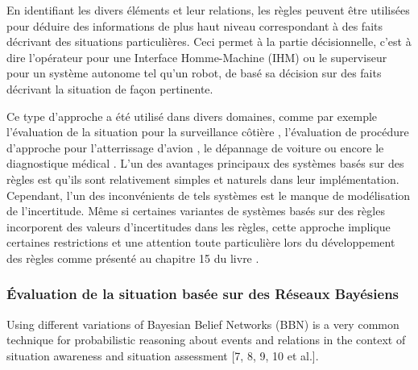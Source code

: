 \documentclass[a4paper,11pt,twoside]{StyleThese}
\begin{document}
En identifiant les divers éléments et leur relations, les règles peuvent être utilisées pour déduire des informations de plus haut niveau correspondant à des faits décrivant des situations particulières. Ceci permet à la partie décisionnelle, c'est à dire l'opérateur pour une Interface Homme-Machine (IHM) ou le superviseur pour un système autonome tel qu'un robot, de basé sa décision sur des faits décrivant la situation de façon pertinente.

Ce type d'approche a été utilisé dans divers domaines, comme par exemple l'évaluation de la situation pour la surveillance côtière \cite{edlund2006rule}, l'évaluation de procédure d'approche pour l'atterrissage d'avion \cite{baron1980procru,milgram1984multi}, le dépannage de voiture ou encore le diagnostique médical \cite{swartout1985rule,miller1982internist}.
L'un des avantages principaux des systèmes basés sur des règles est qu'ils sont relativement simples et naturels dans leur implémentation.
Cependant, l'un des inconvénients de tels systèmes est le manque de modélisation de l'incertitude.
Même si certaines variantes de systèmes basés sur des règles incorporent des valeurs d'incertitudes dans les règles, cette approche implique certaines restrictions et une attention toute particulière lors du développement des règles comme présenté au chapitre 15 du livre \cite{russell2003artificial}.




\subsubsection{Évaluation de la situation basée sur des Réseaux Bayésiens}
Using different variations of Bayesian Belief Networks (BBN) is a very common technique
for probabilistic reasoning about events and relations in the context of situation awareness
and situation assessment [7, 8, 9, 10 et al.].
\end{document}
